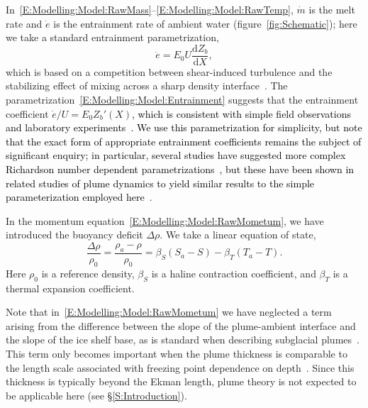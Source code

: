 \documentclass[openacc]{rsproca_new}%
\newcommand{\dd}[2]{\frac{\mathrm{d} #1}{\mathrm{d} #2}}
\newcommand{\red}[1]{{\color{red} #1}}
\newcommand{\blue}[1]{{\color{blue} #1}}
\newcommand{\rout}[1]{\red{\st{#1}}}\newcommand{\ab}[1]{\textcolor{Green}{#1}}\newcommand{\about}[1]{\textcolor{Cyan}{\sout{#1}}}
\renewcommand{\rout}[1]{{}} %
\renewcommand{\blue}[1]{{\textcolor{black}{#1}}} %
\renewcommand{\red}[1]{{}} %
\begin{document}
In~\eqref{E:Modelling:Model:RawMass}--\eqref{E:Modelling:Model:RawTemp}, $\dot{m}$ is the melt rate and $\dot{e}$ is the entrainment rate of ambient water (figure~\ref{fig:Schematic}); here we take a standard entrainment parametrization, 
\begin{equation}\label{E:Modelling:Model:Entrainment}
\dot{e} = E_0 U \dd{Z_b}{X},
\end{equation}
which is based on a competition between shear-induced turbulence and the stabilizing effect of mixing across a sharp density interface~\cite{Pedersen1980,Turner1986JFM}. The parametrization~\eqref{E:Modelling:Model:Entrainment} suggests that the entrainment coefficient $\dot{e}/U = E_0 Z_b'(X)$\blue{, which is consistent with simple field observations~\cite{Pedersen1980} and laboratory experiments~\cite{Wells2005GAF}. We use this parametrization for simplicity, but note that the exact form of appropriate entrainment coefficients remains the subject of significant enquiry; in particular, several studies have suggested more complex Richardson number dependent parametrizations~\cite[e.g.][]{Holland2007JGeophysResOceans}, but these have been shown in related studies of plume dynamics to yield similar results to the simple parameterization employed here}~\cite{Magorrian2016JGeoResOcean}.\rout{has no Richardson number dependence; we use this parametrization for simplicity, but note that entrainment is typically Richardson number dependent.}

In the momentum equation~\eqref{E:Modelling:Model:RawMometum}, we have introduced the buoyancy deficit $\Delta \rho$. We take a linear equation of state,
\begin{equation}\label{E:Modelling:Model:EquationOfState}
\frac{\Delta \rho}{\rho_0}  = \frac{\rho_a - \rho}{\rho_0}= \beta_S(S_a - S) - \beta_T (T_a - T).
\end{equation}
Here $\rho_0$ is a reference density, $\beta_S$ is a haline contraction coefficient, and $\beta_T$ is a thermal expansion coefficient. 

Note that in~\eqref{E:Modelling:Model:RawMometum} we have neglected a term arising from the difference between the slope of the plume-ambient interface and the slope of the ice shelf base, as is standard when describing subglacial plumes~\cite{Hewitt2020AnnRevFlu}. This term only becomes important when the plume thickness is comparable to the length scale associated with freezing point dependence on depth~\cite{Jenkins2011JPhysOcean}. Since this thickness is typically beyond the Ekman length, plume theory is not expected to be applicable here (see \S\ref{S:Introduction}).
\end{document}
